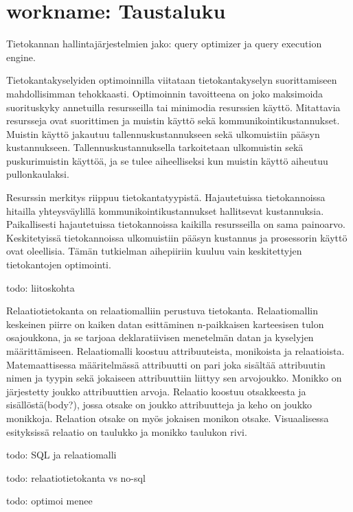 \documentclass[finnish]{tktltiki2}
\theoremstyle{definition}
\theoremstyle{remark}
\begin{document}
\section{workname: Taustaluku}
Tietokannan hallintajärjestelmien jako: query optimizer ja query execution engine.

Tietokantakyselyiden optimoinnilla viitataan tietokantakyselyn suorittamiseen mahdollisimman tehokkaasti. Optimoinnin tavoitteena on joko maksimoida suorituskyky annetuilla resursseilla tai minimodia resurssien käyttö. Mitattavia resursseja ovat suorittimen ja muistin käyttö sekä kommunikointikustannukset. Muistin käyttö jakautuu tallennuskustannukseen sekä ulkomuistiin pääsyn kustannukseen. Tallennuskustannuksella tarkoitetaan ulkomuistin sekä puskurimuistin käyttöä, ja se tulee aiheelliseksi kun muistin käyttö aiheutuu pullonkaulaksi. 

Resurssin merkitys riippuu tietokantatyypistä. Hajautetuissa tietokannoissa hitailla yhteysväylillä kommunikointikustannukset hallitsevat kustannuksia. Paikallisesti hajautetuissa tietokannoissa kaikilla resursseilla on sama painoarvo. Keskitetyissä tietokannoissa ulkomuistiin pääsyn kustannus ja prosessorin käyttö ovat oleellisia. Tämän tutkielman aihepiiriin kuuluu vain keskitettyjen tietokantojen optimointi.

todo: liitoskohta

Relaatiotietokanta on relaatiomalliin perustuva tietokanta. Relaatiomallin keskeinen piirre on kaiken datan esittäminen n-paikkaisen karteesisen tulon osajoukkona, ja se tarjoaa deklaratiivisen menetelmän datan ja kyselyjen määrittämiseen. Relaatiomalli koostuu attribuuteista, monikoista ja relaatioista. Matemaattisessa määritelmässä attribuutti on pari joka sisältää attribuutin nimen ja tyypin sekä jokaiseen attribuuttiin liittyy sen arvojoukko. Monikko on järjestetty joukko attribuuttien arvoja. Relaatio koostuu otsakkeesta ja sisällöstä(body?), jossa otsake on joukko attribuutteja ja keho on joukko monikkoja. Relaation otsake on myös jokaisen monikon otsake. Visuaalisessa esityksissä relaatio on taulukko ja monikko taulukon rivi. 

todo: SQL ja relaatiomalli

todo: relaatiotietokanta vs no-sql

todo: optimoi menee




%
%
% 
%



\end{document}
